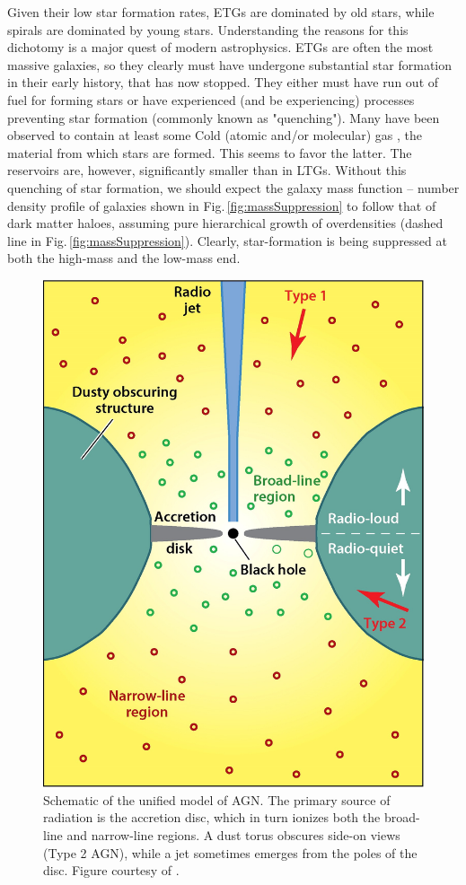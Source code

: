 	Given their low star formation rates, ETGs are dominated by old stars, while spirals are dominated by young stars. Understanding the reasons for this dichotomy is a major quest of modern astrophysics. ETGs are often the most massive galaxies, so they clearly must have undergone substantial star formation in their early history, that has now stopped. They either must have run out of fuel for forming stars or have experienced (and be experiencing) processes preventing star formation (commonly known as "quenching"). Many have been observed to contain at least some Cold (atomic and/or molecular) gas \citep[e.g.][]{Lees1991}, the material from which stars are formed. This seems to favor the latter. The reservoirs are, however, significantly smaller than in LTGs. Without this quenching of star formation, we should expect the galaxy mass function -- number density profile of galaxies shown in Fig.\,\ref{fig:massSuppression} to follow that of dark matter haloes, assuming pure hierarchical growth of overdensities (dashed line in Fig.\,\ref{fig:massSuppression}). Clearly, star-formation is being suppressed at both the high-mass and the low-mass end.

	\begin{figure}
		\centering
		\includegraphics[width=.5\textwidth]{introduction/unifiedAGN.jpeg}
		\caption[Schematic of unified model of AGN]{Schematic of the unified model of AGN. The primary source of radiation is the accretion disc, which in turn ionizes both the broad-line and narrow-line regions. A dust torus obscures side-on views (Type 2 AGN), while a jet sometimes emerges from the poles of the disc. Figure courtesy of \citet{Heckman2014}.}
		\label{fig:UnifiedAGN}
	\end{figure}

